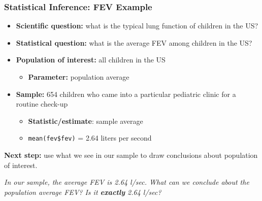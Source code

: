 \documentclass[12pt, 
hyperref={colorlinks=true, linkcolor=blue, urlcolor=cyan}]{beamer}
\begin{document}
\begin{frame}
\frametitle{Statistical Inference: FEV Example} %

\begin{itemize}
\item \textbf{Scientific question:} what is the \color{orange} typical \color{black} \color{blue} lung function \color{black} of children in the US? \pause 
\item \textbf{Statistical question:} what is the \color{orange} average \color{black} \color{blue} FEV \color{black} among children in the US? \pause %
\item \textbf{Population of interest:} all children in the US \pause
	\begin{itemize}
	\item \textbf{Parameter:} population average \pause
	\end{itemize}
\item \textbf{Sample:} 654 children who came into a particular pediatric clinic for a routine check-up \pause
	\begin{itemize}
	\item \textbf{Statistic/estimate}: sample average 
	\item[]\begin{footnotesize} \texttt{mean(fev\$fev)} = 2.64 liters per second \end{footnotesize}
	\end{itemize}
\end{itemize}

\pause
\vspace{-0.2cm} \textbf{Next step:} use what we see in our sample to draw conclusions about population of interest. \begin{footnotesize}\textit{In our sample, the average FEV is 2.64 l/sec. What can we conclude about the population average FEV? Is it \textbf{exactly} 2.64 l/sec?}\\ \end{footnotesize}

\end{frame}
\end{document}
